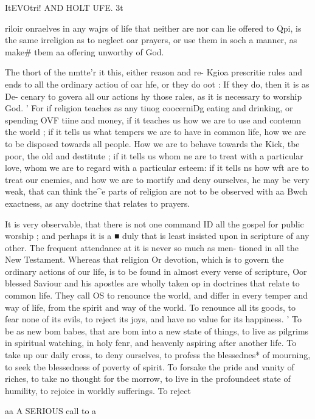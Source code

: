 \documentclass[
]{book}
\begin{document}
ItEVOtri! AND HOLT UFE. 3t

riloir onraelves in any wajrs of life that neither are nor can lie offered to Qpi, is the same irreligion as to neglect oar prayers, or use them in soch a manner, as make\# tbem aa offering unworthy of God.

The thort of the nmtte'r it this, either reason and re- Kgioa prescritie rules and ends to all the ordinary actiou of oar hfe, or they do oot : If they do, then it is as De- cenary to govera all our actions hy those rales, as it is necessary to worship God. ' For if religion teaches as any tiuog coocerniDg eating and drinking, or spending OVF tiine and money, if it teaches us how we are to use and contemn the world ; if it tells us what tempers we are to have in common life, how we are to be disposed towards all people. How we are to behave towards the Kick, tbe poor, the old and destitute ; if it tells us whom ne are to treat with a particular love, whom we are to regard with a particular esteem: if it tells ns how wft are to treat our enemies, and how we are to mortify and deny ourselves, he may be very weak, that can think the\^{}e parts of religion are not to be observed with aa Bwch exactness, as any doctrine that relates to prayers.

It is very observable, that there is not one command ID all the gospel for public worship ; and perhaps it is a ■ duly that is least insisted upon in scripture of any other. The frequent attendance at it is never so much as men- tioned in all the New Testament. Whereas that religion Or devotion, which is to govern the ordinary actions of our life, is to be found in almost every verse of scripture, Oor blessed Saviour and his apostles are wholly taken op in doctrines that relate to common life. They call OS to renounce the world, and differ in every temper and way of life, from the spirit and way of the world. To renounce all its goods, to fear none of its evils, to reject its joys, and have no value for its happiness. ' To be as new bom babes, that are bom into a new state of things, to live as pilgrims in spiritual watching, in holy fenr, and heavenly aspiring after another life. To take up our daily cross, to deny ourselves, to profess the blessednes* of mourning, to seek tbe blessedness of poverty of spirit. To forsake the pride and vanity of riches, to take no thought for tbe morrow, to live in the profoundeet state of humility, to rejoice in worldly sufferings. To reject

aa A SERIOUS call to a
\end{document}
